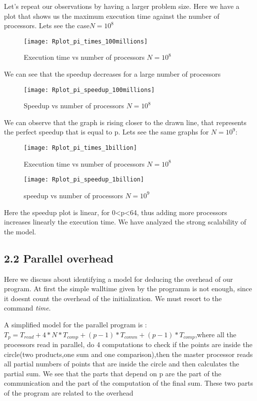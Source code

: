 \documentclass[11pt]{scrartcl} %
\begin{document}
Let's repeat our observations by having a larger problem size.
Here we have a plot that shows us the maximum execution time against the number of processors. Lets see the case$ N=10^8$
\begin{figure}[H] %
	\centering
	\texttt{[image: Rplot\_pi\_times\_100millions]} %
	\caption{Execution time vs number of processors $N= 10^8$}
\end{figure}
We can see that the speedup  decreases for a large number of processors
\begin{figure}[H] %
	\centering
	\texttt{[image: Rplot\_pi\_speedup\_100millions]} %
	\caption{Speedup vs number of processors $N=10^8$}
\end{figure}
We can observe that the graph is rising closer to the drawn line, that represents the perfect speedup that is equal to p.
Lets see the same graphs for $N=10^9$:
\begin{figure}[H] %
	\centering
	\texttt{[image: Rplot\_pi\_times\_1billion]} %
	\caption{ Execution time vs number of processors $N= 10^8$}
\end{figure}
\begin{figure}[H] %
	\centering
	\texttt{[image: Rplot\_pi\_speedup\_1billion]} %
	\caption{speedup vs number of processors $N= 10^9$}
\end{figure}

Here the speedup plot is linear, for 0<p<64, thus adding more processors increases linearly the execution time.
 We have analyzed the strong scalability of the model. 
\subsection{2.2 Parallel overhead}
Here we discuss about identifying a model for deducing the overhead of our program. At first the simple walltime given by the programm is not enough, since it doesnt count the overhead of the initialization. We must resort to the command \textit{time}.

A simplified model for the parallel program is :
$T_p=T_{read}+4*N*T_{comp}+(p-1)*T_{comm}+(p-1)*T_{comp}$,where all the processors read in parallel, do 4 computations to check if the points are inside the circle(two products,one sum and one comparison),then the master processor reads all partial numbers of points that are inside the circle and then calculates the partial sum.
We see that the parts that depend on p are the part of the communication and the part of the computation of the final sum. These two parts of the program are related to the overhead
\end{document}

